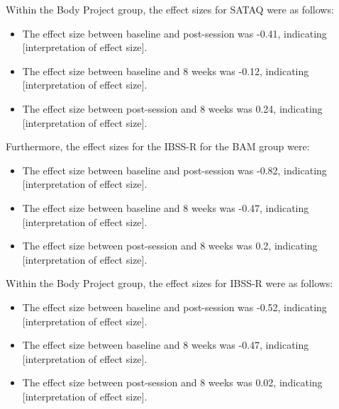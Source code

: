 \documentclass[
  letterpaper,
  DIV=11,
  numbers=noendperiod]{scrreprt}
\begin{document}
Within the Body Project group, the effect sizes for SATAQ were as
follows:

\begin{itemize}
\item
  The effect size between baseline and post-session was -0.41,
  indicating {[}interpretation of effect size{]}.
\item
  The effect size between baseline and 8 weeks was -0.12, indicating
  {[}interpretation of effect size{]}.
\item
  The effect size between post-session and 8 weeks was 0.24, indicating
  {[}interpretation of effect size{]}.
\end{itemize}

Furthermore, the effect sizes for the IBSS-R for the BAM group were:

\begin{itemize}
\item
  The effect size between baseline and post-session was -0.82,
  indicating {[}interpretation of effect size{]}.
\item
  The effect size between baseline and 8 weeks was -0.47, indicating
  {[}interpretation of effect size{]}.
\item
  The effect size between post-session and 8 weeks was 0.2, indicating
  {[}interpretation of effect size{]}.
\end{itemize}

Within the Body Project group, the effect sizes for IBSS-R were as
follows:

\begin{itemize}
\item
  The effect size between baseline and post-session was -0.52,
  indicating {[}interpretation of effect size{]}.
\item
  The effect size between baseline and 8 weeks was -0.47, indicating
  {[}interpretation of effect size{]}.
\item
  The effect size between post-session and 8 weeks was 0.02, indicating
  {[}interpretation of effect size{]}.
\end{itemize}
\end{document}
